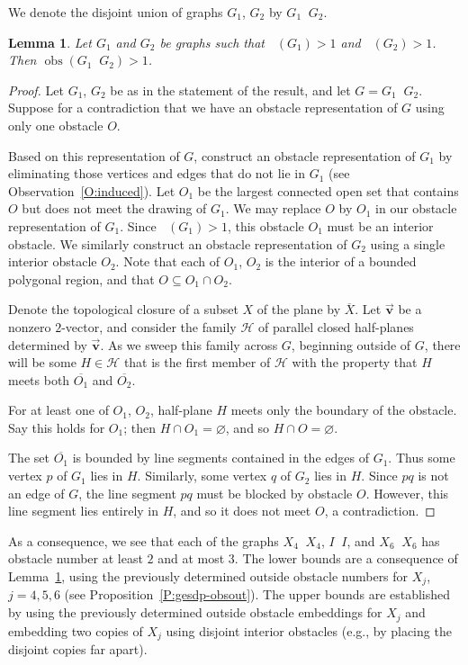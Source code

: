 \documentclass[12pt]{amsart}
\newtheorem{lemma}[theorem]{Lemma}
\theoremstyle{remark}
\newcommand{\bv}[1]{\ensuremath{ \vec{\mathbf{#1}}} }
\DeclareMathOperator*{\cupdotop}{\ensuremath{\dot{\cup}}}
\DeclareMathOperator{\obs}{\ensuremath{\mathrm{obs}}}
\DeclareMathOperator{\obsout}{\ensuremath{\obs_\mathrm{out}}}
\begin{document}
We denote the disjoint union of graphs $G_1$, $G_2$
by $G_1\cupdotop G_2$.

\begin{lemma} \label{L:disjun}
Let $G_1$ and $G_2$ be graphs
such that
$\obsout(G_1) > 1$ and $\obsout(G_2) > 1$.
Then $\obs(G_1\cupdotop G_2) > 1$.\end{lemma}

\begin{proof}
Let $G_1$, $G_2$ be as in the statement of the result,
and
let $G=G_{1}\cupdotop G_{2}$.
Suppose for a contradiction that
we have an obstacle representation of $G$ using only
one obstacle $O$.

Based on this representation of $G$,
construct an
obstacle representation of $G_1$ by eliminating
those vertices and edges that do not lie in $G_1$
(see Observation~\ref{O:induced}).
Let $O_1$ be the largest connected open set
that contains $O$ but does not meet the drawing of $G_1$.
We may replace $O$ by $O_1$ in our obstacle representation of $G_1$.
Since $\obsout(G_1) > 1$,
this obstacle $O_1$ must be an interior obstacle.
We similarly construct an obstacle representation
of $G_2$ using a single interior obstacle $O_2$.
Note that each of $O_1$, $O_2$ is the interior of a bounded
polygonal region,
and that $O\subseteq O_1\cap O_2$.

Denote the topological closure of a subset $X$ of the plane
by $\overline{X}$.
Let $\bv{v}$ be a nonzero $2$-vector,
and consider the family $\mathcal{H}$ of parallel closed half-planes
determined by $\bv{v}$.
As we sweep this family across $G$,
beginning outside of $G$,
there will be some $H\in\mathcal{H}$
that is the first member of $\mathcal{H}$
with the property that
$H$ meets both $\overline{O_1}$ and $\overline{O_2}$.

For at least one of $O_1$, $O_2$,
half-plane $H$ meets only the boundary of the
obstacle.
Say this holds for $O_1$;
then $H\cap O_1 = \varnothing$,
and so $H\cap O = \varnothing$.

The set $\overline{O_1}$
is bounded by line segments contained in the edges of $G_1$.
Thus some vertex $p$ of $G_1$ lies in $H$.
Similarly, some vertex $q$ of $G_2$ lies in $H$.
Since $pq$ is not an edge of $G$,
the line segment $pq$
must be blocked by obstacle $O$.
However, this line segment
lies entirely in $H$, and so it does not meet $O$,
a contradiction.
\end{proof}

As a consequence, we see that
each of the graphs
$X_{4}\cupdotop X_{4}$,
$I\cupdotop I$,
and
$X_{6}\cupdotop X_{6}$
has obstacle number at least $2$ and at most $3$.
The lower bounds are a consequence of Lemma~\ref{L:disjun},
using the previously determined outside obstacle numbers
for $X_{j}$, $j = 4,5,6$
(see Proposition~\ref{P:gesdp-obsout}).
The upper bounds are established by using the previously determined
outside obstacle embeddings for $X_{j}$ and embedding
two copies of $X_{j}$ using disjoint interior obstacles
(e.g., by placing the disjoint copies far apart).
\end{document}
